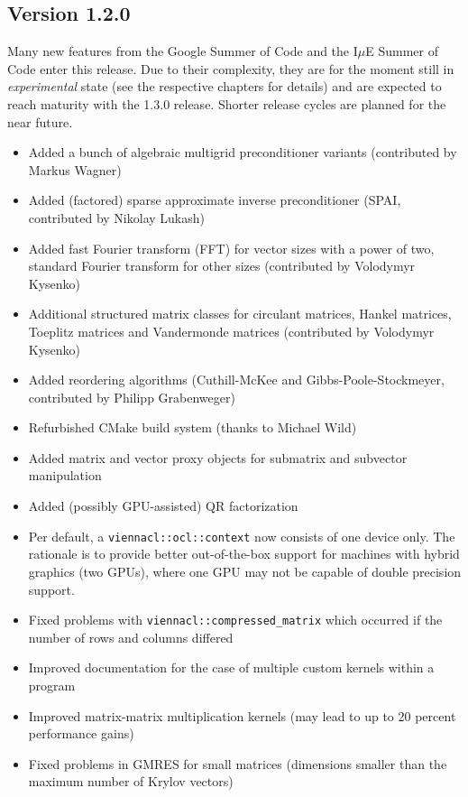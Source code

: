 \subsection*{Version 1.2.0}
Many new features from the Google Summer of Code and the I$\mu$E Summer of Code enter this release.
Due to their complexity, they are for the moment still in \textit{experimental} state (see the respective chapters for details) and are expected to reach maturity with the 1.3.0 release.
Shorter release cycles are planned for the near future.
\begin{itemize}
 \item Added a bunch of algebraic multigrid preconditioner variants (contributed by Markus Wagner)
 \item Added (factored) sparse approximate inverse preconditioner (SPAI, contributed by Nikolay Lukash)
 \item Added fast Fourier transform (FFT) for vector sizes with a power of two, standard Fourier transform for other sizes (contributed by Volodymyr Kysenko)
 \item Additional structured matrix classes for circulant matrices, Hankel matrices, Toeplitz matrices and Vandermonde matrices (contributed by Volodymyr Kysenko)
 \item Added reordering algorithms (Cuthill-McKee and Gibbs-Poole-Stockmeyer, contributed by Philipp Grabenweger)
 \item Refurbished CMake build system (thanks to Michael Wild)
 \item Added matrix and vector proxy objects for submatrix and subvector manipulation
 \item Added (possibly GPU-assisted) QR factorization
 \item Per default, a \lstinline|viennacl::ocl::context| now consists of one device only. The rationale is to provide better out-of-the-box support for machines with hybrid graphics (two GPUs), where one GPU may not be capable of double precision support.
 \item Fixed problems with \lstinline|viennacl::compressed_matrix| which occurred if the number of rows and columns differed
 \item Improved documentation for the case of multiple custom kernels within a program
 \item Improved matrix-matrix multiplication kernels (may lead to up to 20 percent performance gains)
 \item Fixed problems in GMRES for small matrices (dimensions smaller than the maximum number of Krylov vectors)
\end{itemize}



